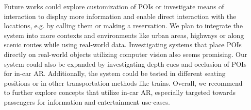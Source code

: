 Future works could explore customization of POIs or investigate means of interaction to display more information and enable direct interaction with the locations, e.g. by calling them or making a reservation. We plan to integrate the system into more contexts and environments like urban areas, highways or along scenic routes while using real-world data. Investigating systems that place POIs directly on real-world objects utilizing computer vision also seems promising. Our system could also be expanded by investigating depth cues and occlusion of POIs for in-car AR. Additionally, the system could be tested in different seating positions or in other transportation methods like trains. Overall, we recommend to further explore concepts that utilize in-car AR, especially targeted towards passengers for information and entertainment use-cases.
